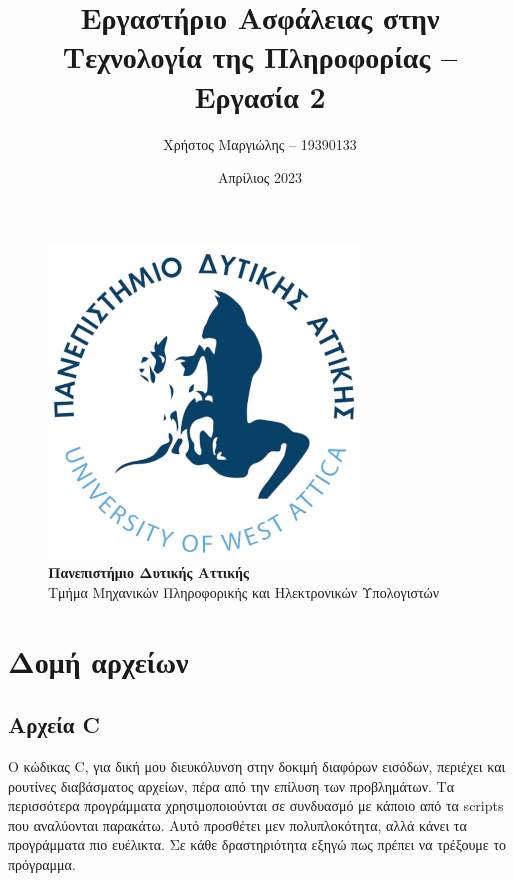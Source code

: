 \documentclass[12pt]{article}
\title{Εργαστήριο Ασφάλειας στην Τεχνολογία της Πληροφορίας -- Εργασία 2}
\author{Χρήστος Μαργιώλης -- 19390133}
\date{Απρίλιος 2023}
\begin{document}
\begin{titlepage}
        \maketitle
        \begin{figure}[t!]
        \begin{center}
        \includegraphics[scale=0.3]{./res/uniwalogo.png} \\
        \Large
        \textbf{Πανεπιστήμιο Δυτικής Αττικής} \\
        \large
        Τμήμα Μηχανικών Πληροφορικής και Ηλεκτρονικών Υπολογιστών
        \end{center}
        \end{figure}
\end{titlepage}

\renewcommand{\contentsname}{Περιεχόμενα}
\tableofcontents
\pagebreak

\section{Δομή αρχείων}

\subsection{Αρχεία C}

Ο κώδικας C, για δική μου διευκόλυνση στην δοκιμή διαφόρων εισόδων, περιέχει και
ρουτίνες διαβάσματος αρχείων, πέρα από την επίλυση των προβλημάτων. Τα περισσότερα
προγράμματα χρησιμοποιούνται σε συνδυασμό με κάποιο από τα scripts που αναλύονται
παρακάτω. Αυτό προσθέτει μεν πολυπλοκότητα, αλλά κάνει τα προγράμματα πιο ευέλικτα.
Σε κάθε δραστηριότητα εξηγώ πως πρέπει να τρέξουμε το πρόγραμμα.
\end{document}
